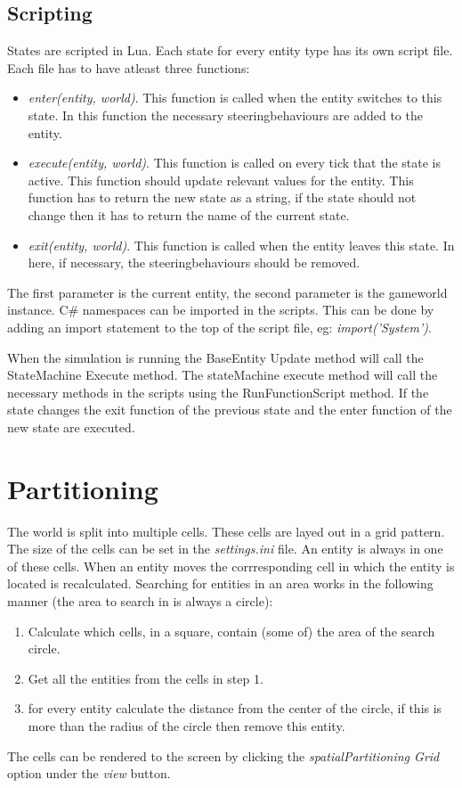 \documentclass[10pt]{extarticle} %
\begin{document}
   \subsection {Scripting}
   States are scripted in Lua. Each state for every entity type has its own script file. Each file has to have atleast three functions: 
   \begin{itemize}
   \item \emph{enter(entity, world)}. This function is called when the entity switches to this state. In this function the necessary steeringbehaviours are added to the entity.
   \item \emph{execute(entity, world)}. This function is called on every tick that the state is active. This function should update relevant values for the entity. This function has to return the new state as a string, if the state should not change then it has to return the name of the current state.
   \item \emph{exit(entity, world)}. This function is called when the entity leaves this state. In here, if necessary, the steeringbehaviours should be removed.
   \end{itemize}
   The first parameter is the current entity, the second parameter is the gameworld instance. C\# namespaces can be imported in the scripts. This can be done by adding an import statement to the top of the script file, eg: \emph{import('System')}.
   
   When the simulation is running the BaseEntity Update method will call the StateMachine Execute method. The stateMachine execute method will call the necessary methods in the scripts using the RunFunctionScript method. If the state changes the exit function of the previous state and the enter function of the new state are executed.
   
   \newpage
   \section {Partitioning}
   The world is split into multiple cells. These cells are layed out in a grid pattern. The size of the cells can be set in the \emph{settings.ini} file. An entity is always in one of these cells. When an entity moves the corrresponding cell in which the entity is located is recalculated. Searching for entities in an area works in the following manner (the area to search in is always a circle):
   \begin{enumerate}
   \item Calculate which cells, in a square, contain (some of) the area of the search circle.
   \item Get all the entities from the cells in step 1.
   \item for every entity calculate the distance from the center of the circle, if this is more than the radius of the circle then remove this entity.
   \end{enumerate}
   The cells can be rendered to the screen by clicking the \emph{spatialPartitioning Grid} option under the \emph{view} button. 
   
\end{document}
